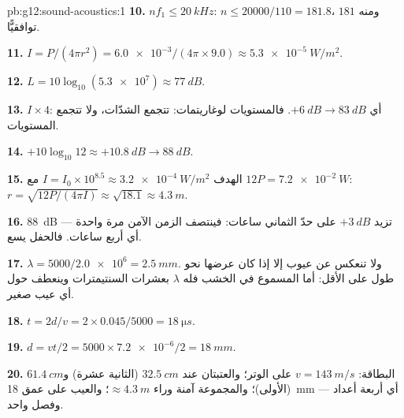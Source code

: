 \begin{solution}{pb:g12:sound-acoustics:1}
\textbf{10.} $nf_1 \le \qty{20}{kHz}$: $n \le 20000/110 = 181.8$،
ومنه $181$ توافقيًّا.

\textbf{11.} $I = P/(4\pi r^2) = \num{6.0e-3}/(4\pi \times 9.0)
\approx \qty{5.3e-5}{W/m^2}$.

\textbf{12.} $L = 10\log_{10}(\num{5.3e7}) \approx \qty{77}{dB}$.

\textbf{13.} $I \times 4$: أي $+\qty{6}{dB} \to \qty{83}{dB}$. فالمستويات
لوغاريتمات: تتجمع الشدّات، ولا تتجمع المستويات.

\textbf{14.} $+10\log_{10}12 \approx +\qty{10.8}{dB} \to
\qty{88}{dB}$.

\textbf{15.} الهدف $I = I_0 \times 10^{8.5} \approx
\qty{3.2e-4}{W/m^2}$ مع $12P = \qty{7.2e-2}{W}$:
$r = \sqrt{12P/(4\pi I)} \approx \sqrt{18.1} \approx \qty{4.3}{m}$.

\textbf{16.} \qty{88}{dB} تزيد $+\qty{3}{dB}$ على حدّ الثماني
ساعات: فينتصف الزمن الآمن مرة واحدة --- أي أربع ساعات. فالحفل يسع.

\textbf{17.} $\lambda = 5000/\num{2.0e6} = \qty{2.5}{mm}$. ولا تنعكس 
عن عيوب إلا إذا كان عرضها نحو طول  على الأقل: أما 
المسموع في الخشب فله $\lambda$ بعشرات السنتيمترات وينعطف
حول أي عيب صغير.

\textbf{18.} $t = 2d/v = 2 \times 0.045/5000 = \qty{18}{\micro s}$.

\textbf{19.} $d = vt/2 = 5000 \times \num{7.2e-6}/2 = \qty{18}{mm}$.

\textbf{20.} البطاقة: $v = \qty{143}{m/s}$ على الوتر؛ والعتبتان عند
$\qty{32.5}{cm}$ (الثانية عشرة) و$\qty{61.4}{cm}$ (الأولى)؛ والمجموعة
آمنة وراء $\approx \qty{4.3}{m}$؛ والعيب على عمق \qty{18}{mm} --- أي أربعة
أعداد وفصل واحد.
\end{solution}
